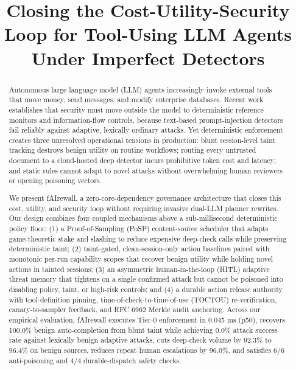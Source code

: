 \documentclass[conference]{IEEEtran}
\begin{document}
\title{Closing the Cost-Utility-Security Loop for Tool-Using LLM Agents Under Imperfect Detectors}

\author{
\and
{}
}

\maketitle

\begin{abstract}
Autonomous large language model (LLM) agents increasingly invoke external tools that move money, send messages, and modify enterprise databases. Recent work establishes that security must move outside the model to deterministic reference monitors and information-flow controls, because text-based prompt-injection detectors fail reliably against adaptive, lexically ordinary attacks. Yet deterministic enforcement creates three unresolved operational tensions in production: blunt session-level taint tracking destroys benign utility on routine workflows; routing every untrusted document to a cloud-hosted deep detector incurs prohibitive token cost and latency; and static rules cannot adapt to novel attacks without overwhelming human reviewers or opening poisoning vectors.

We present fAIrewall, a zero-core-dependency governance architecture that closes this cost, utility, and security loop without requiring invasive dual-LLM planner rewrites. Our design combines four coupled mechanisms above a sub-millisecond deterministic policy floor: (1) a Proof-of-Sampling (PoSP) content-source scheduler that adapts game-theoretic stake and slashing to reduce expensive deep-check calls while preserving deterministic taint; (2) taint-gated, clean-session-only action baselines paired with monotonic per-run capability scopes that recover benign utility while holding novel actions in tainted sessions; (3) an asymmetric human-in-the-loop (HITL) adaptive threat memory that tightens on a single confirmed attack but cannot be poisoned into disabling policy, taint, or high-risk controls; and (4) a durable action release authority with tool-definition pinning, time-of-check-to-time-of-use (TOCTOU) re-verification, canary-to-sampler feedback, and RFC 6962 Merkle audit anchoring. Across our empirical evaluation, fAIrewall executes Tier-0 enforcement in 0.045 ms (p50), recovers 100.0\% benign auto-completion from blunt taint while achieving 0.0\% attack success rate against lexically benign adaptive attacks, cuts deep-check volume by 92.3\% to 96.4\% on benign sources, reduces repeat human escalations by 96.0\%, and satisfies 6/6 anti-poisoning and 4/4 durable-dispatch safety checks.
\end{abstract}
\end{document}
